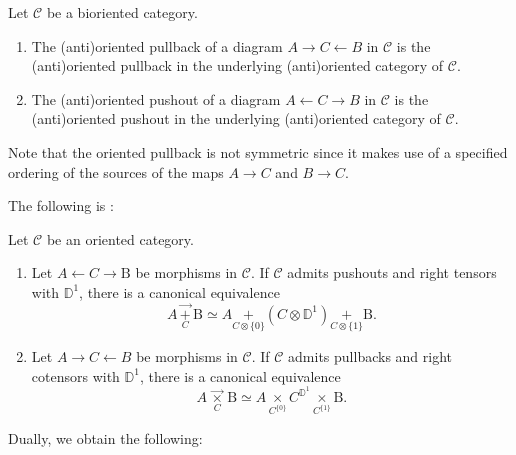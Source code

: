 \documentclass[10pt,oneside]{article}
\numberwithin{equation}{section} %
\numberwithin{figure}{section} %
\theoremstyle{plain}
\theoremstyle{definition}
\newcommand{\bD}{{\mathbb D}}
\newcommand{\mC}{{\mathcal C}}
\newcommand{\A}{A}
\newcommand{\B}{\mathrm{B}}
\newcommand{\C}{C}
\newcommand{\ot}{\otimes}
\begin{document}
\begin{definition}Let $\mC$ be a bioriented category.
\begin{enumerate}[\normalfont(1)]\setlength{\itemsep}{-2pt}

\item The (anti)oriented pullback of a diagram $A \to C\leftarrow B$ in $\mC$ is the (anti)oriented pullback in the underlying (anti)oriented category of $\mC$.

\item The (anti)oriented pushout of a diagram $A \leftarrow C \to B$ in $\mC$ is the (anti)oriented pushout in the underlying (anti)oriented category of $\mC$.

\end{enumerate}

\end{definition}


\begin{remark}
Note that the oriented pullback is not symmetric since it makes use of a specified ordering of the sources of the maps $A\to C$ and $B\to C$.
\end{remark}


The following is \cite[Lemma 3.8.6.]{oriented}:

\begin{lemma}\label{0desc}\label{adesc}
Let $\mC$ be an oriented category.
\begin{enumerate}[\normalfont(1)]\setlength{\itemsep}{-2pt}
\item Let $A \leftarrow C \to \B$ be morphisms in $\mC$. If $\mC$ admits pushouts and right tensors with $\bD^1$, 
there is a canonical equivalence $$\A\,\underset{C}{\vec{+}}\, \B \simeq \A\!\!\underset{C \otimes \{0\}}{+} \!\!(\C \ot \bD^1) \!\!\underset{C \otimes \{1\}}{+}\!\!\B.$$	

\item Let $A \to C\leftarrow B$ be morphisms in $\mC$. If $\mC$ admits pullbacks and right cotensors with $\bD^1$, 
there is a canonical equivalence $${\A \,\underset{\C}{\vec{\times}}}\, \B \simeq \A \!\!\underset{\C^{\{0\}}}{\times} \!\!{\C^{\bD^1}}\!\!\underset{{\C^{\{1\}}}}{\times}  \!\!\B.$$	
\end{enumerate}

\end{lemma}

Dually, we obtain the following:
\end{document}
